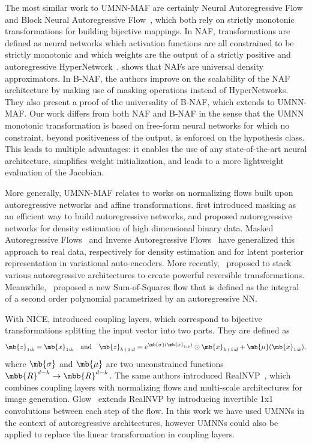 The most similar work to UMNN-MAF are certainly Neural Autoregressive Flow~\citep[NAF, ][]{huang_neural_2018} and Block Neural Autoregressive Flow~\citep[B-NAF, ][]{de_cao_block_2020}, which both rely on strictly monotonic transformations for building bijective mappings.
In NAF, transformations are defined as neural networks which activation functions are all constrained to be strictly monotonic and which weights are the output of a strictly positive and autoregressive HyperNetwork~\citep{hypernetworks}.
\cite{huang_neural_2018} shows that NAFs are universal density approximators.
In B-NAF, the authors improve on the scalability of the NAF architecture by making use of masking operations instead of HyperNetworks. They also present a proof of the universality of B-NAF, which extends to UMNN-MAF.
Our work differs from both NAF and B-NAF in the sense that the UMNN monotonic transformation is based on free-form neural networks for which no constraint,  beyond positiveness of the output, is enforced on the hypothesis class.
This leads to multiple advantages: it enables the use of any state-of-the-art neural architecture, simplifies weight initialization, and leads to a more lightweight evaluation of the Jacobian.

More generally, UMNN-MAF relates to works on normalizing flows built upon autoregressive networks and affine transformations.
\cite{germain_made_2015} first introduced masking as an efficient way to build autoregressive networks, and proposed autoregressive networks for density estimation of high dimensional binary data.
Masked Autoregressive Flows~\citep{papamakarios_masked_2017} and Inverse Autoregressive Flows~\citep{kingma_improved_2016} have generalized this approach to real data, respectively for density estimation and for latent posterior representation in variational auto-encoders.
More recently, \cite{oliva_transformation_2018}~proposed to stack various autoregressive architectures to create powerful reversible transformations. Meanwhile, \cite{jaini_sum--squares_2019}~proposed a new Sum-of-Squares flow that is defined as the integral of a second order polynomial parametrized by an autoregressive NN.

With NICE, \cite{NICE} introduced coupling layers, which correspond to bijective transformations splitting the input vector into two parts. They are defined as
\begin{align}
    \mb{z}_{1:k} = \mb{x}_{1:k}\quad \text{and}\quad
    \mb{z}_{k+1:d} = e^{\mb{\sigma}(\mb{x}_{1:k})} \odot	 \mb{x}_{k+1:d} + \mb{\mu}(\mb{x}_{1:k}),
\end{align}
where $\mb{\sigma}$ and $\mb{\mu}$ are two unconstrained functions $\mbb{R}^{d-k} \rightarrow \mbb{R}^{d-k}$.
The same authors introduced RealNVP~\citep{dinh_density_2017}, which combines coupling layers with normalizing flows and multi-scale architectures for image generation.
Glow~\citep{kingma_glow_2018} extends RealNVP by introducing invertible 1x1 convolutions between each step of the flow.
In this work we have used UMNNs in the context of autoregressive architectures, however UMNNs could also be applied to replace the linear transformation in coupling layers.

